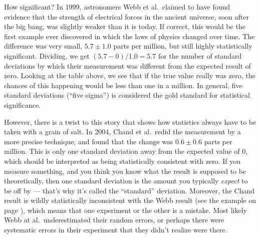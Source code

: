 
\begin{eg}{How significant?}\label{eg:fine-structure}
In 1999, astronomers Webb et al.~claimed to have found evidence that the strength of electrical forces in the ancient universe,
soon after the big bang, was slightly weaker than it is today. If correct, this would be the first example ever discovered in which
the laws of physics changed over time. The difference was very small, $5.7\pm1.0$ parts per million, but still highly statistically
significant. Dividing, we get $(5.7-0)/1.0=5.7$ for the number of standard deviations by which their measurement was different from the
expected result of zero. Looking at the table above, we see that if the true value really was zero, the chances of this happening would
be less than one in a million. In general, five standard deviations (``five sigma'') is considered the gold standard for statistical
significance.

However, there is a twist to this story that shows how statistics always have to be taken with a grain of salt.
In 2004, Chand et al.~redid the measurement by a more precise technique, and found that the change was $0.6\pm 0.6$ parts per million.
This is only one standard deviation away from the expected value of 0, which should be interpreted as being statistically consistent
with zero. If you measure something, and you think you know what the result is supposed to be theoretically, then one standard
deviation is the amount you typically \emph{expect} to be off by --- that's why it's called the ``standard'' deviation. Moreover,
the Chand result is wildly statistically inconsistent with the Webb result (see the example on page \pageref{eg:difference-between-measurements}),
which means that one experiment or the other is
a mistake. Most likely Webb at al.~underestimated their random errors, or perhaps there were systematic errors in their experiment
that they didn't realize were there.
\end{eg}

